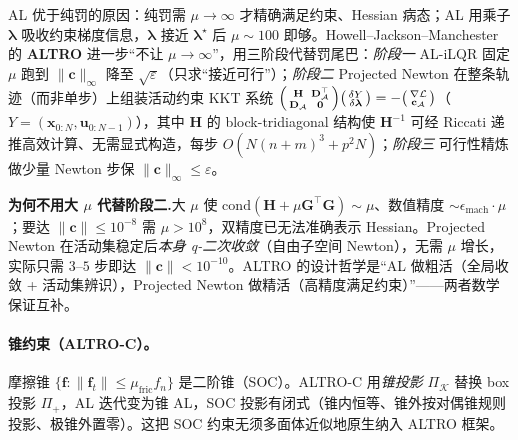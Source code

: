 AL 优于纯罚的原因：纯罚需 $\mu\to\infty$ 才精确满足约束、Hessian 病态；AL 用乘子 $\boldsymbol{\lambda}$ 吸收约束梯度信息，$\boldsymbol{\lambda}$ 接近 $\boldsymbol{\lambda}^\star$ 后 $\mu\sim100$ 即够。Howell--Jackson--Manchester 的 \textbf{ALTRO} 进一步“不让 $\mu\to\infty$”，用三阶段代替罚尾巴\cite{howell2019altro}：\emph{阶段一} AL-iLQR 固定 $\mu$ 跑到 $\|\mathbf{c}\|_\infty$ 降至 $\sqrt\varepsilon$（只求“接近可行”）；\emph{阶段二} Projected Newton 在整条轨迹（而非单步）上组装活动约束 KKT 系统 $\begin{psmallmatrix}\mathbf{H}&\mathbf{D}_{\mathcal{A}}^\top\\\mathbf{D}_{\mathcal{A}}&\mathbf{0}\end{psmallmatrix}\begin{psmallmatrix}\delta Y\\\delta\boldsymbol{\lambda}\end{psmallmatrix}=-\begin{psmallmatrix}\nabla\mathcal{L}\\\mathbf{c}_{\mathcal{A}}\end{psmallmatrix}$（$Y=(\mathbf{x}_{0:N},\mathbf{u}_{0:N-1})$），其中 $\mathbf{H}$ 的 block-tridiagonal 结构使 $\mathbf{H}^{-1}$ 可经 Riccati 递推高效计算、无需显式构造，每步 $O(N(n+m)^3+p^2N)$；\emph{阶段三} 可行性精炼做少量 Newton 步保 $\|\mathbf{c}\|_\infty\le\varepsilon$。

\begin{insight}
\textbf{为何不用大 $\mu$ 代替阶段二.}\;大 $\mu$ 使 $\mathrm{cond}(\mathbf{H}+\mu\mathbf{G}^\top\mathbf{G})\sim\mu$、数值精度 $\sim\epsilon_{\mathrm{mach}}\cdot\mu$；要达 $\|\mathbf{c}\|\le10^{-8}$ 需 $\mu>10^8$，双精度已无法准确表示 Hessian。Projected Newton 在活动集稳定后\emph{本身 q-二次收敛}（自由子空间 Newton），无需 $\mu$ 增长，实际只需 $3$--$5$ 步即达 $\|\mathbf{c}\|<10^{-10}$。ALTRO 的设计哲学是“AL 做粗活（全局收敛 + 活动集辨识），Projected Newton 做精活（高精度满足约束）”——两者数学保证互补。
\end{insight}

\paragraph{锥约束（ALTRO-C）。}\;
摩擦锥 $\{\mathbf{f}:\|\mathbf{f}_t\|\le\mu_{\mathrm{fric}}f_n\}$ 是二阶锥（SOC）。ALTRO-C 用\emph{锥投影} $\Pi_{\mathcal{K}}$ 替换 box 投影 $\Pi_+$，AL 迭代变为锥 AL\cite{jackson2021altroc}，SOC 投影有闭式（锥内恒等、锥外按对偶锥规则投影、极锥外置零）。这把 SOC 约束无须多面体近似地原生纳入 ALTRO 框架。

